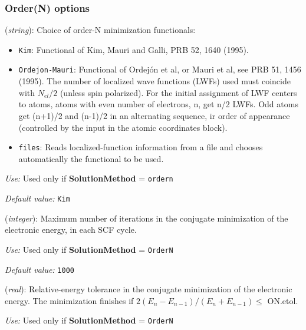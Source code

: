 \documentclass[11pt]{article}
\begin{document}
\subsubsection{Order(N) options}
\begin{description}
\itemsep 10pt
\parsep 0pt

\item[{\bf ON.functional}] ({\it string}): 
Choice of order-N minimization functionals: 
\begin{itemize}
\item {\tt Kim}: 
Functional of Kim, Mauri and Galli, PRB 52, 1640 (1995).
\item {\tt Ordejon-Mauri}: 
Functional of Ordej\'on et al, or Mauri et al, see PRB 51, 1456 (1995).
The number of localized wave functions (LWFs) used must coincide with 
$N_{el}/2$ (unless spin polarized). 
For the initial assignment of LWF centers to atoms, atoms
with even number of electrons, n, get n/2 LWFs. Odd atoms
get (n+1)/2 and (n-1)/2 in an alternating sequence, ir order
of appearance (controlled by the input in the atomic coordinates block).

\item {\tt files}: 
Reads localized-function information from a file and 
chooses automatically the functional to be used. 
\end{itemize}

{\it Use:} Used only if {\bf SolutionMethod} = {\tt ordern}

{\it Default value:} {\tt Kim}

\item[{\bf ON.MaxNumIter}] ({\it integer}): 
Maximum number of iterations
in the conjugate minimization of the electronic
energy, in each SCF cycle.

{\it Use:} Used only if {\bf SolutionMethod} = {\tt OrderN}

{\it Default value:} {\tt 1000}

\item[{\bf ON.etol}] ({\it real}): 
Relative-energy tolerance in the conjugate minimization of the electronic
energy. The minimization finishes if 
\hspace{0.2truecm} $2 (E_n - E_{n-1}) / (E_n + E_{n-1}) \leq $ ON.etol.

{\it Use:} Used only if {\bf SolutionMethod} = {\tt OrderN}


\end{description}
\end{document}
